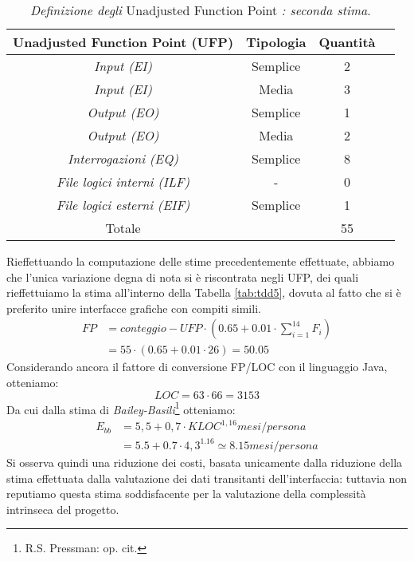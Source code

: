 \begin{table}[!t]
\centering
\begin{tabular}{cccc}
\toprule
\textbf{Unadjusted Function Point (UFP)} & \textbf{Tipologia} & \textbf{Quantità}\\
\midrule
\textit{Input (EI)} & Semplice & 2\\
\textit{Input (EI)} & Media & 3\\
\textit{Output (EO)} & Semplice & 1\\
\textit{Output (EO)} & Media & 2\\
\textit{Interrogazioni (EQ)} & Semplice & 8\\
\textit{File logici interni (ILF)} & - & 0\\
\textit{File logici esterni (EIF)} & Semplice & 1\\
\bottomrule
Totale & & 55\\
\end{tabular}
\caption{\textit{Definizione degli} Unadjusted Function Point \textit{: seconda stima}.}
\label{tab:tdd5}
\end{table}

Rieffettuando la computazione delle stime precedentemente effettuate, abbiamo
che l'unica variazione degna di nota si è riscontrata negli UFP, dei quali 
rieffettuiamo la stima all'interno della Tabella \vref{tab:tdd5}, dovuta 
al fatto che si è preferito unire interfacce grafiche con compiti simili.
\[\begin{split}
FP &= conteggio-UFP \cdot (0.65+0.01\cdot\sum_{i=1}^{14} F_i)\\
   &= 55\cdot (0.65+0.01\cdot 26)=50.05
\end{split}\]
Considerando ancora il fattore di conversione FP/LOC con il linguaggio Java,
otteniamo:
\[LOC = 63\cdot 66=3153\]
Da cui dalla stima di \textit{Bailey-Basili}\footnote{R.S. Pressman: op. cit.}
otteniamo:
\[\begin{split}
E_{bb} &= 5,5+0,7\cdot {KLOC}^{1,16} mesi/persona\\
       &= 5.5+0.7\cdot {4,3}^{1.16}\simeq 8.15 mesi/persona
\end{split}\]
Si osserva quindi una riduzione dei costi, basata unicamente dalla riduzione
della stima effettuata dalla valutazione dei dati transitanti dell'interfaccia:
tuttavia non reputiamo questa stima soddisfacente per la valutazione della
complessità intrinseca del progetto.
